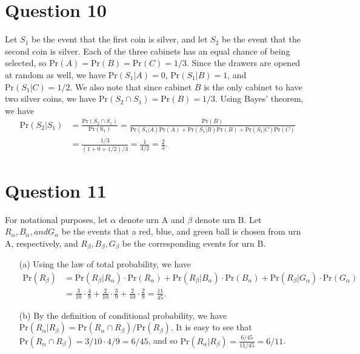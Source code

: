 \documentclass[10pt]{article}
\begin{document}
\section{Question 10} \noindent
Let \(S_1\) be the event that the first coin is silver, and let \(S_2\) be the event that the second coin is silver. Each of the three cabinets has an equal
chance of being selected, so \(\mathrm{Pr}(A) = \mathrm{Pr}(B) = \mathrm{Pr}(C) = 1/3\). Since the drawers are opened at random as well, we have 
\(\mathrm{Pr}(S_1 | A) = 0\), \(\mathrm{Pr}(S_1 | B) = 1\), and \(\mathrm{Pr}(S_1 | C) = 1/2\). We also note that since cabinet \(B\) is the only cabinet to 
have two silver coins, we have \(\mathrm{Pr}(S_2 \cap S_1) = \mathrm{Pr}(B) = 1/3\). Using Bayes' theorem, we have 
\begin{align*}
    \mathrm{Pr}(S_2 | S_1) &= \frac{\mathrm{Pr}(S_2 \cap S_1)}{\mathrm{Pr(S_1)}} = \frac{\mathrm{Pr}(B)}{\mathrm{Pr}(S_1|A)\mathrm{Pr}(A) +
    \mathrm{Pr}(S_1|B)\mathrm{Pr}(B) + \mathrm{Pr}(S_1|C)\mathrm{Pr}(C)} \\
    &= \frac{1/3}{\left( 1 + 0 + 1/2 \right)/3} = \frac{1}{3/2} = \frac{2}{3}.
\end{align*}

\section{Question 11} \noindent
For notational purposes, let \(\alpha\) denote urn A and \(\beta\) denote urn B. Let \(R_{\alpha}, B_{\alpha}, and G_{\alpha}\) be the events that a red, 
blue, and green ball is chosen from urn A, respectively, and \(R_{\beta},B_{\beta},G_{\beta}\) be the corresponding events for urn B. 
\begin{itemize}
    \item[(a)] Using the law of total probability, we have 
    \begin{align*}
        \mathrm{Pr}(R_{\beta}) &= \mathrm{Pr}(R_{\beta}|R_{\alpha}) \cdot \mathrm{Pr}(R_{\alpha}) + \mathrm{Pr}(R_{\beta}|B_{\alpha})\cdot\mathrm{Pr}(B_{\alpha})
        + \mathrm{Pr}(R_{\beta}|G_{\alpha})\cdot\mathrm{Pr}(G_{\alpha}) \\
        &= \frac{3}{10}\cdot\frac{4}{9} + \frac{2}{10}\cdot\frac{3}{9} + \frac{2}{10}\cdot\frac{2}{9} = \frac{11}{45}.
    \end{align*}
    \item[(b)] By the definition of conditional probability, we have \(\mathrm{Pr}(R_{\alpha}|R_{\beta}) = \mathrm{Pr}(R_{\alpha}\cap R_{\beta}) / 
    \mathrm{Pr}(R_{\beta})\). It is easy to see that \(\mathrm{Pr}(R_{\alpha}\cap R_{\beta}) = 3/10 \cdot 4/9 = 6/45\), and so 
    \(\mathrm{Pr}(R_{\alpha}|R_{\beta}) = \frac{6/45}{11/45} = 6/11\).
\end{itemize}
\end{document}
